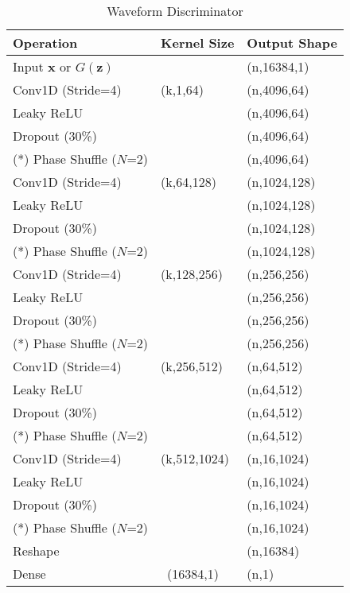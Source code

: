\begin{table}[H]
\caption{Waveform Discriminator}\label{wavegan_disc}
\centering
\begin{tabular}{l|l|l}
Operation & Kernel Size & Output Shape \\ \hline
Input $\boldsymbol{x}$ or $G(\boldsymbol z)$ & \  & (n,16384,1)\\
Conv1D (Stride=4) & (k,1,64) & (n,4096,64)\\
Leaky ReLU & \ & (n,4096,64) \\
Dropout (30\%) & \ & (n,4096,64)\\
(*) Phase Shuffle ($N$=2) & \ & (n,4096,64)\\
Conv1D (Stride=4) & (k,64,128) & (n,1024,128)\\
Leaky ReLU & \ & (n,1024,128) \\
Dropout (30\%) & \ & (n,1024,128)\\
(*) Phase Shuffle ($N$=2) & \ & (n,1024,128)\\
Conv1D (Stride=4) & (k,128,256) & (n,256,256)\\
Leaky ReLU & \ & (n,256,256) \\
Dropout (30\%) & \ & (n,256,256)\\
(*) Phase Shuffle ($N$=2) & \ & (n,256,256)\\
Conv1D (Stride=4) & (k,256,512) & (n,64,512)\\
Leaky ReLU & \ & (n,64,512) \\
Dropout (30\%) & \ & (n,64,512)\\
(*) Phase Shuffle ($N$=2) & \ & (n,64,512)\\
Conv1D (Stride=4) & (k,512,1024) & (n,16,1024)\\
Leaky ReLU & \ & (n,16,1024) \\
Dropout (30\%) & \ & (n,16,1024)\\
(*) Phase Shuffle ($N$=2) & \ & (n,16,1024)\\
Reshape &\ & (n,16384)\\
Dense &\ (16384,1) & (n,1)
\end{tabular}
\end{table}





